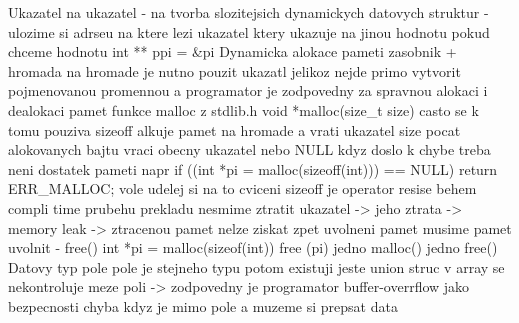 \documentclass{article}
\begin{document}
Ukazatel na ukazatel
- na tvorba slozitejsich dynamickych datovych struktur
- ulozime si adrseu na ktere lezi ukazatel ktery ukazuje na jinou hodnotu
        pokud chceme hodnotu int ** ppi = &pi
Dynamicka alokace pameti
    zasobnik + hromada
    na hromade je nutno pouzit ukazatl jelikoz nejde primo vytvorit pojmenovanou promennou
    a programator je zodpovedny za spravnou alokaci i dealokaci pamet
    funkce malloc z stdlib.h
                    void *malloc(size_t size) casto se k tomu pouziva sizeoff
                    alkuje pamet na hromade a vrati ukazatel
                    size pocat alokovanych bajtu
                    vraci obecny ukazatel nebo NULL kdyz doslo k chybe treba neni dostatek pameti
napr if ((int *pi = malloc(sizeoff(int))) == NULL)
{
 return ERR_MALLOC;
}
vole udelej si na to cviceni
sizeoff je operator resise behem compli time prubehu prekladu
nesmime ztratit ukazatel -> jeho ztrata -> memory leak -> ztracenou pamet nelze ziskat zpet
uvolneni pamet
musime pamet uvolnit - free()
int *pi = malloc(sizeof(int))
free (pi)
jedno malloc() jedno free()
Datovy typ pole
pole je stejneho typu
potom existuji jeste union struc
v array se nekontroluje meze poli -> zodpovedny je programator
buffer-overrflow jako bezpecnosti chyba kdyz je mimo pole a muzeme si prepsat data
\end{document}
